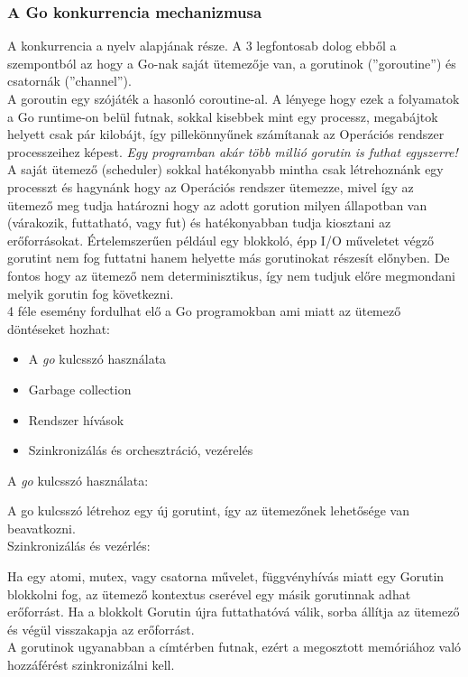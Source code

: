 \subsubsection{A Go konkurrencia mechanizmusa}
A konkurrencia a nyelv alapjának része. A 3 legfontosab dolog ebből a szempontból az hogy a Go-nak saját ütemezője van,
a gorutinok (''goroutine'') és csatornák (''channel'').\\
A goroutin egy szójáték a hasonló coroutine-al. A lényege hogy ezek a folyamatok a Go runtime-on belül futnak, sokkal kisebbek mint egy processz, megabájtok helyett csak pár kilobájt,
így pillekönnyűnek számítanak az Operációs rendszer processzeihez képest. \emph{Egy programban akár több millió gorutin is futhat egyszerre!}
A saját ütemező (scheduler) sokkal hatékonyabb mintha csak létrehoznánk egy processzt és hagynánk hogy az Operációs rendszer ütemezze,
mivel így az ütemező meg tudja határozni hogy az adott gorution milyen állapotban van (várakozik, futtatható, vagy fut) és hatékonyabban tudja
kiosztani az erőforrásokat. Értelemszerűen például egy blokkoló, épp I/O műveletet végző gorutint nem fog futtatni hanem helyette más gorutinokat részesít
előnyben. De fontos hogy az ütemező nem determinisztikus, így nem tudjuk előre megmondani melyik gorutin fog következni.\\
4 féle esemény fordulhat elő a Go programokban ami miatt az ütemező döntéseket hozhat:
\begin{itemize}
    \item A \emph{go} kulcsszó használata
    \item Garbage collection
    \item Rendszer hívások
    \item Szinkronizálás és orchesztráció, vezérelés
\end{itemize}
A \emph{go} kulcsszó használata: \par
A go kulcsszó létrehoz egy új gorutint, így az ütemezőnek lehetősége van beavatkozni.\\
Szinkronizálás és vezérlés: \par
Ha egy atomi, mutex, vagy csatorna művelet, függvényhívás miatt egy Gorutin blokkolni fog, az ütemező kontextus cserével egy másik gorutinnak adhat erőforrást. Ha a blokkolt Gorutin újra futtathatóvá válik, sorba állítja az ütemező és végül visszakapja az erőforrást.\\
A gorutinok ugyanabban a címtérben futnak, ezért a megosztott memóriához való hozzáférést szinkronizálni kell.

